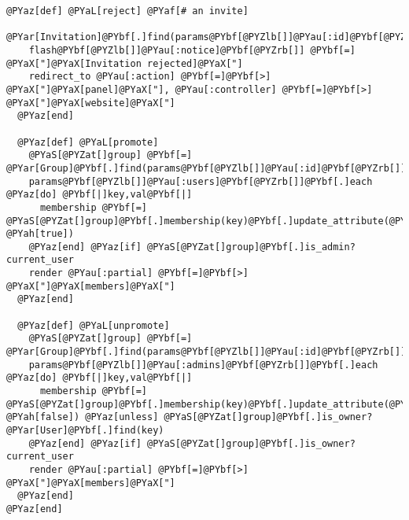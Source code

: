 \begin{Verbatim}[commandchars=@\[\]]
  @PYaz[def] @PYaL[reject] @PYaf[# an invite]
    @PYar[Invitation]@PYbf[.]find(params@PYbf[@PYZlb[]]@PYau[:id]@PYbf[@PYZrb[]])@PYbf[.]destroy
    flash@PYbf[@PYZlb[]]@PYau[:notice]@PYbf[@PYZrb[]] @PYbf[=] @PYaX["]@PYaX[Invitation rejected]@PYaX["]
    redirect_to @PYau[:action] @PYbf[=]@PYbf[>] @PYaX["]@PYaX[panel]@PYaX["], @PYau[:controller] @PYbf[=]@PYbf[>] @PYaX["]@PYaX[website]@PYaX["]
  @PYaz[end]
  
  @PYaz[def] @PYaL[promote]
    @PYaS[@PYZat[]group] @PYbf[=] @PYar[Group]@PYbf[.]find(params@PYbf[@PYZlb[]]@PYau[:id]@PYbf[@PYZrb[]])
    params@PYbf[@PYZlb[]]@PYau[:users]@PYbf[@PYZrb[]]@PYbf[.]each @PYaz[do] @PYbf[|]key,val@PYbf[|]
      membership @PYbf[=] @PYaS[@PYZat[]group]@PYbf[.]membership(key)@PYbf[.]update_attribute(@PYau[:admin], @PYah[true])
    @PYaz[end] @PYaz[if] @PYaS[@PYZat[]group]@PYbf[.]is_admin? current_user
    render @PYau[:partial] @PYbf[=]@PYbf[>] @PYaX["]@PYaX[members]@PYaX["]
  @PYaz[end]
  
  @PYaz[def] @PYaL[unpromote]
    @PYaS[@PYZat[]group] @PYbf[=] @PYar[Group]@PYbf[.]find(params@PYbf[@PYZlb[]]@PYau[:id]@PYbf[@PYZrb[]])
    params@PYbf[@PYZlb[]]@PYau[:admins]@PYbf[@PYZrb[]]@PYbf[.]each @PYaz[do] @PYbf[|]key,val@PYbf[|]
      membership @PYbf[=] @PYaS[@PYZat[]group]@PYbf[.]membership(key)@PYbf[.]update_attribute(@PYau[:admin], @PYah[false]) @PYaz[unless] @PYaS[@PYZat[]group]@PYbf[.]is_owner? @PYar[User]@PYbf[.]find(key)
    @PYaz[end] @PYaz[if] @PYaS[@PYZat[]group]@PYbf[.]is_owner? current_user
    render @PYau[:partial] @PYbf[=]@PYbf[>] @PYaX["]@PYaX[members]@PYaX["]
  @PYaz[end]
@PYaz[end]
\end{Verbatim}



